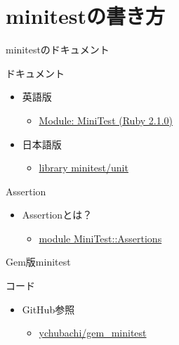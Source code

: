 \documentclass[t, aspectratio=169]{beamer}
\begin{document}
\section{minitestの書き方}
\label{sec-6-3}
\begin{frame}[label=sec-6-3-1]{minitestのドキュメント}
\begin{block}{ドキュメント}
\begin{itemize}
\item 英語版
\begin{itemize}
\item \href{http://ruby-doc.org/stdlib-2.1.0/libdoc/minitest/rdoc/MiniTest.html}{Module: MiniTest (Ruby 2.1.0)}
\end{itemize}
\item 日本語版
\begin{itemize}
\item \href{http://docs.ruby-lang.org/ja/2.1.0/library/minitest=2funit.html}{library minitest/unit}
\end{itemize}
\end{itemize}
\end{block}
\end{frame}
\begin{frame}[label=sec-6-3-2]{Assertion}
\begin{itemize}
\item Assertionとは？
\begin{itemize}
\item \href{http://docs.ruby-lang.org/ja/2.1.0/class/MiniTest=3a=3aAssertions.html}{module MiniTest::Assertions}
\end{itemize}
\end{itemize}
\end{frame}
\begin{frame}[label=sec-6-3-3]{Gem版minitest}
\begin{block}{コード}
\begin{itemize}
\item GitHub参照
\begin{itemize}
\item \href{https://github.com/ychubachi/gem_minitest}{ychubachi/gem\_minitest}
\end{itemize}
\end{itemize}
\end{block}
\end{frame}
\end{document}
